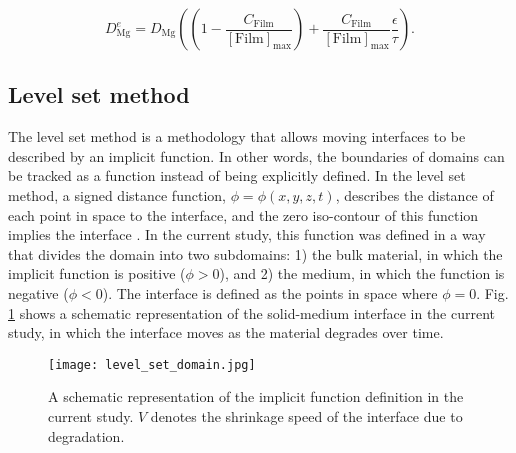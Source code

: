 \begin{equation} \label{eq:diff_coeff_parallel}
D_{\mathrm{Mg}}^{e}=D_{\mathrm{Mg}}\left(\left(1-\frac{C_{\mathrm{Film}}}{[\mathrm{Film}]_{\max }}\right)+\frac{C_{\mathrm{Film}}}{[\mathrm{Film}]_{\max }} \frac{\epsilon}{\tau}\right).
\end{equation}

\subsection{Level set method}

The level set method is a methodology that allows moving interfaces to be described by an implicit function. In other words, the boundaries of domains can be tracked as a function instead of being explicitly defined. In the level set method, a signed distance function, $\phi = \phi(x,y,z,t)$, describes the distance of each point in space to the interface, and the zero iso-contour of this function implies the interface \cite{RonaldFedkiw2002}. In the current study, this function was defined in a way that divides the domain into two subdomains: 1) the bulk material, in which the implicit function is positive ($\phi > 0$), and 2) the medium, in which the function is negative ($\phi < 0$). The interface is defined as the points in space where $\phi = 0$. Fig. \ref{fig:level_set_domain} shows a schematic representation of the solid-medium interface in the current study, in which the interface moves as the material degrades over time.

\begin{figure}[h]
\centering
\medskip
\texttt{[image: level\_set\_domain.jpg]}
\caption[The implicit function definition in the studied problem]{A schematic representation of the implicit function definition in the current study. $V$ denotes the shrinkage speed of the interface due to degradation.} \label{fig:level_set_domain}
\end{figure}

